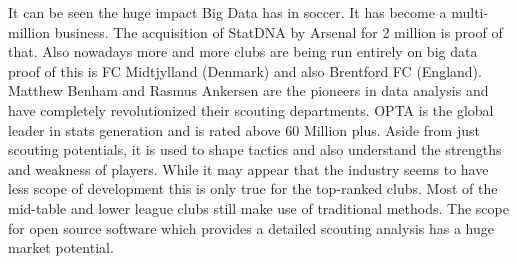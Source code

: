 \documentclass[sigconf]{acmart}
\begin{document}
It can be seen the huge impact Big Data has in soccer. It has become a multi-million business. The acquisition of StatDNA by Arsenal for 2 million is proof of that. Also nowadays more and more clubs are being run entirely on big data proof of this is FC Midtjylland (Denmark) and also Brentford FC (England). Matthew Benham and Rasmus Ankersen are the pioneers in data analysis and have completely revolutionized their scouting departments. OPTA is the global leader in stats generation and is rated above 60 Million plus. Aside from just scouting potentials, it is used to shape tactics and also understand the strengths and weakness of players. While it may appear that the industry seems to have less scope of development this is only true for the top-ranked clubs. Most of the mid-table and lower league clubs still make use of traditional methods. The scope for open source software which provides a detailed scouting analysis has a huge market potential.


 
\end{document}
